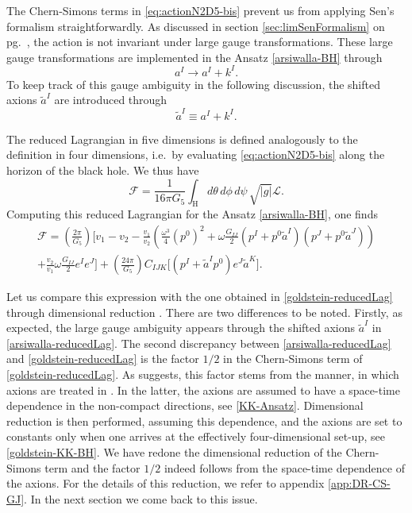 \documentclass[12pt,twoside]{book}
\begin{document}
The Chern-Simons terms in \eqref{eq:actionN2D5-bis} prevent us from applying Sen's formalism straightforwardly. As discussed in section \ref{sec:limSenFormalism} on pg.\ \pageref{sec:limSenFormalism}, the action is not invariant under large gauge transformations. These large gauge transformations are implemented in the Ansatz \eqref{arsiwalla-BH} through \cite{Arsiwalla:2008gc}
\begin{equation}
a^{I} \rightarrow a^{I} + k^{I}.
\end{equation}
To keep track of this gauge ambiguity in the following discussion, the shifted axions $\tilde{a}^{I}$ are introduced through
\begin{equation}
\tilde{a}^{I} \equiv a^{I} + k^{I}.
\end{equation}

The reduced Lagrangian in five dimensions is defined analogously to the definition in four dimensions, i.e.\ by evaluating \eqref{eq:actionN2D5-bis} along the horizon of the black hole. We thus have
\begin{equation}
\mathcal{F} = \frac{1}{16\pi G_{5}} \int_{\mathrm{H}} d\theta\, d\phi \, d\psi \, \sqrt{|g|} \mathcal{L}.
\end{equation}
Computing this reduced Lagrangian for the Ansatz \eqref{arsiwalla-BH}, one finds \cite{Arsiwalla:2008gc}
\begin{multline}\label{arsiwalla-reducedLag}
\mathcal{F} = \left(
\frac{2\pi}{G_{5}} \right)\Bigg[ v_{1} -v_{2}
- \frac{v_{1}}{v_{2}}\left( \frac{\omega^{3}}{4}(p^{0})^{2}
+ \omega \frac{G_{IJ}}{2}(p^{I} + p^{0}\tilde{a}^{I})(p^{J} + p^{0}\tilde{a}^{J}) \right)\\
+ \frac{v_{2}}{v_{1}} \omega\frac{G_{IJ}}{2} e^{I}e^{J} \Bigg]
+ \left( \frac{24\pi}{G_{5}} \right) C_{IJK} \big[ ( p^{I} + \tilde{a}^{I}p^{0}) e^{J}\tilde{a}^{K} \big].
\end{multline}

Let us compare this expression with the one obtained in \eqref{goldstein-reducedLag} through dimensional reduction \cite{Goldstein:2007kx}. There are two differences to be noted. Firstly, as expected, the large gauge ambiguity appears through the shifted axions $\tilde{a}^{I}$ in \eqref{arsiwalla-reducedLag}. The second discrepancy between \eqref{arsiwalla-reducedLag} and \eqref{goldstein-reducedLag} is the factor $1/2$ in the Chern-Simons term of \eqref{goldstein-reducedLag}. As \cite{Arsiwalla:2008gc} suggests, this factor stems from the manner, in which axions are treated in \cite{Goldstein:2007kx}. In the latter, the axions are assumed to have a space-time dependence in the non-compact directions, see \eqref{KK-Ansatz}. Dimensional reduction is then performed, assuming this dependence, and the axions are set to constants only when one arrives at the effectively four-dimensional set-up, see \eqref{goldstein-KK-BH}. We have redone the dimensional reduction of the Chern-Simons term and the factor $1/2$ indeed follows from the space-time dependence of the axions. For the details of this reduction, we refer to appendix \ref{app:DR-CS-GJ}. In the next section we come back to this issue.\newline
\end{document}
